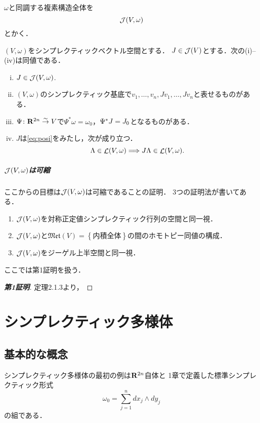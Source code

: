\(\omega\)と同調する複素構造全体を
\[
    \mathop{\mathcal{J}}(V,\omega)
\]
とかく．
\setcounter{AXM}{3}
\begin{leftbar}
\begin{PRP}
    \((V,\omega)\)をシンプレクティックベクトル空間とする．
    \(J\in\mathop{\mathcal{J}}(V)\)とする．次の(i)--(iv)は同値である．
    \begin{enumerate}[(i)]
        \item \(J\in\mathop{\mathcal{J}}(V,\omega)\). 
        \item \((V,\omega)\)のシンプレクティック基底で\(v_1,\dots,v_n,Jv_1,\dots,Jv_n\)と表せるものがある．
        \item \(\Psi\colon \mathbf{R}^{2n}\mathrel{\overset{\sim}{\rightarrow}} V\)で\(\Psi^\ast\omega=\omega_0\)，\(\Psi^\ast J=\mathord{J_0}\)となるものがある．
        \item \(J\)は\eqref{eq:posi}をみたし，次が成り立つ．\begin{equation}
            \Lambda\in\mathop{\mathcal{L}}(V,\omega)
            \Longrightarrow
            J\Lambda\in\mathop{\mathcal{L}}(V,\omega).
        \end{equation}
    \end{enumerate}
\end{PRP}
\end{leftbar}

\paragraph{\(\mathop{\mathcal{J}}(V,\omega)\)は可縮}
ここからの目標は\(\mathop{\mathcal{J}}(V,\omega)\)は可縮であることの証明．
3つの証明法が書いてある．
\begin{enumerate}
    \item \(\mathop{\mathcal{J}}(V,\omega)\)を対称正定値シンプレクティック行列の空間と同一視．
    \item \(\mathop{\mathcal{J}}(V,\omega)\)と\(\mathfrak{Met}(V)=\left\{\text{内積全体}\right\}\)の間のホモトピー同値の構成．    
    \item \(\mathop{\mathcal{J}}(V,\omega)\)をジーゲル上半空間と同一視．
\end{enumerate}
ここでは第1証明を扱う．
\begin{proof}[\textbf{第1証明}]
    定理2.1.3より，
\end{proof}


\clearpage

\chapter{シンプレクティック多様体}
\section{基本的な概念}
\begin{leftbar}
    \begin{EG}
        シンプレクティック多様体の最初の例は\(\mathbf{R}^{2n}\)自体と
        1章で定義した標準シンプレクティック形式
        \[
            \omega_0=\sum_{j=1}^{n}dx_j\wedge dy_j
        \]の組である．
    \end{EG}
\end{leftbar}


